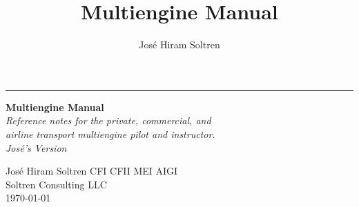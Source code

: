 \documentclass[11pt,twoside,letterpaper,onecolumn]{book}
\author{Jos\'e Hiram Soltren}
\title{Multiengine Manual}
\begin{document}



\begin{titlepage} %
\raggedleft %
\rule{1pt}{\textheight} %
\hspace{0.05\textwidth} %
\parbox[b]{0.75\textwidth}{ %
{\Huge\bfseries Multiengine Manual}\\[2\baselineskip] %
{\large\textit{Reference notes for the private, commercial, and \\
    airline transport multiengine pilot and instructor. \\
    Jos\'e's Version}}\\[4\baselineskip] %


\vspace{0.5\textheight} %

{\noindent Jos\'e Hiram Soltren CFI CFII MEI AIGI \\ Soltren Consulting LLC}\\[\baselineskip] %
{\noindent \today }\\[\baselineskip] %
}

\end{titlepage}
\end{document}
